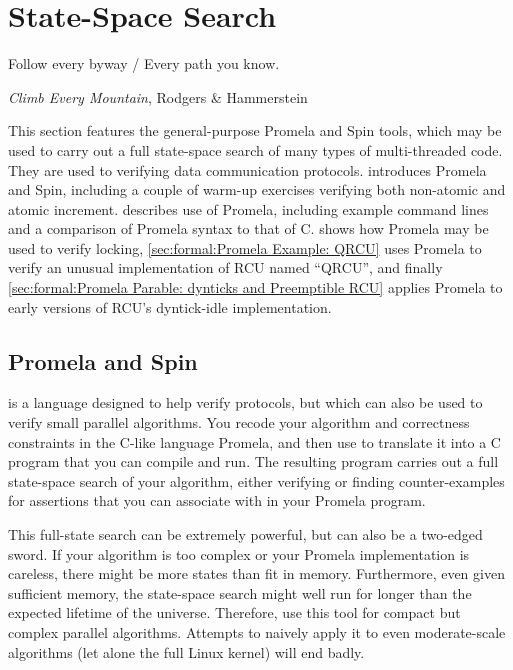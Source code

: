 
\section{State-Space Search}
\label{sec:formal:State-Space Search}
%
\epigraph{Follow every byway / Every path you know.}
	 {\emph{Climb Every Mountain}, Rodgers \& Hammerstein}

This section features the general-purpose Promela and Spin tools,
which may be used to carry out a full
state-space search of many types of multi-threaded code.
They are used to verifying data communication protocols.
introduces Promela and Spin, including a couple of warm-up exercises
verifying both non-atomic and atomic increment.
describes use of Promela, including example command lines and a
comparison of Promela syntax to that of C\@.
shows how Promela may be used to verify locking,
\cref{sec:formal:Promela Example: QRCU}
uses Promela to verify an unusual implementation of RCU named ``QRCU'',
and finally
\cref{sec:formal:Promela Parable: dynticks and Preemptible RCU}
applies Promela to early versions of RCU's dyntick-idle implementation.

\subsection{Promela and Spin}
\label{sec:formal:Promela and Spin}

 is a language designed to help verify protocols, but which
can also be used to verify small parallel algorithms.
You recode your algorithm and correctness constraints in the C-like
language Promela, and then use  to translate it into a C program
that you can compile and run.
The resulting program carries out a full state-space search of your
algorithm, either verifying or finding counter-examples for
assertions that you can associate with in your Promela program.

This full-state search can be extremely powerful, but can also be a two-edged
sword.
If your algorithm is too complex or your Promela implementation is
careless, there might be more states than fit in memory.
Furthermore, even given sufficient memory, the state-space search might
well run for longer than the expected lifetime of the universe.
Therefore, use this tool for compact but complex parallel algorithms.
Attempts to naively apply it to even moderate-scale algorithms (let alone
the full Linux kernel) will end badly.

